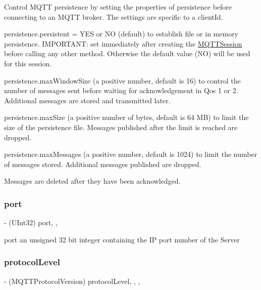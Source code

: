Control M\+Q\+TT persistence by setting the properties of persistence before connecting to an M\+Q\+TT broker. The settings are specific to a client\+Id.

persistence.\+persistent = Y\+ES or NO (default) to establish file or in memory persistence. I\+M\+P\+O\+R\+T\+A\+NT\+: set immediately after creating the \hyperlink{interface_m_q_t_t_session}{M\+Q\+T\+T\+Session} before calling any other method. Otherwise the default value (NO) will be used for this session.

persistence.\+max\+Window\+Size (a positive number, default is 16) to control the number of messages sent before waiting for acknowledgement in Qos 1 or 2. Additional messages are stored and transmitted later.

persistence.\+max\+Size (a positive number of bytes, default is 64 MB) to limit the size of the persistence file. Messages published after the limit is reached are dropped.

persistence.\+max\+Messages (a positive number, default is 1024) to limit the number of messages stored. Additional messages published are dropped.

Messages are deleted after they have been acknowledged. \mbox{\label{interface_m_q_t_t_session_a22334eec8bf0b3ba97e2391f70d43320}} 
\subsubsection{\texorpdfstring{port}{port}}
{\footnotesize\ttfamily -\/ (U\+Int32) port\hspace{0.3cm}{\ttfamily [read]}, {\ttfamily [atomic]}, {\ttfamily [assign]}}

port an unsigned 32 bit integer containing the IP port number of the Server \mbox{\label{interface_m_q_t_t_session_a12e20758c5f8a1f0f2bd7dac339fe88f}} 
\subsubsection{\texorpdfstring{protocol\+Level}{protocolLevel}}
{\footnotesize\ttfamily -\/ (M\+Q\+T\+T\+Protocol\+Version) protocol\+Level\hspace{0.3cm}{\ttfamily [read]}, {\ttfamily [write]}, {\ttfamily [nonatomic]}, {\ttfamily [assign]}}

